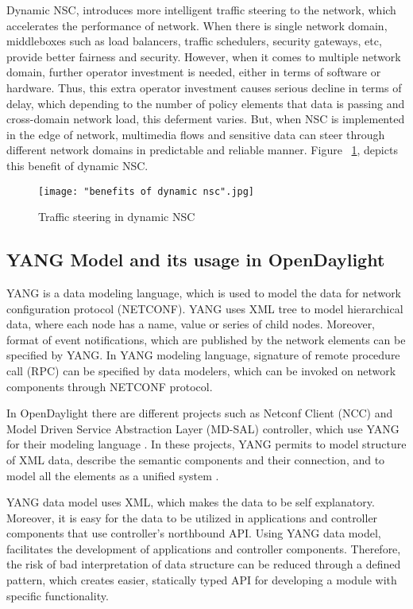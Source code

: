 \documentclass[english]{tktltiki2}
\theoremstyle{definition}
\theoremstyle{remark}
\begin{document}
Dynamic NSC, introduces more intelligent traffic steering to the network, which accelerates the performance of network. When there is single network domain, middleboxes such as load balancers, traffic schedulers, security gateways, etc, provide better fairness and  security. However, when it comes to multiple network domain, further operator investment is needed, either in terms of software or hardware. Thus, this extra operator investment causes serious decline in terms of delay, which depending to the number of policy elements that data is passing and cross-domain network load, this deferment varies. But, when NSC is implemented in the edge of network, multimedia flows and sensitive data can steer through different network domains in predictable and reliable manner. Figure ~\ref{fig:NSCbenefit}, depicts this benefit of dynamic NSC. 


\begin{figure}[h!]
\centering
{}
\texttt{[image: "benefits of dynamic nsc".jpg]}
\caption{Traffic steering in dynamic NSC \cite{Wol13}}
\label{fig:NSCbenefit}
\end{figure}

\subsection{YANG Model and its usage in OpenDaylight}

YANG is a data modeling language, which is used to model the data for network configuration protocol (NETCONF). YANG uses XML tree to model hierarchical data, where each node has a name, value or series of child nodes. Moreover, format of event notifications, which are published by the network elements can be specified by YANG. In YANG modeling language, signature of remote procedure call (RPC) can be specified by data modelers, which can be invoked on network components through NETCONF protocol. \cite{Bjo10}

In OpenDaylight there are different projects such as Netconf Client (NCC) and Model Driven Service Abstraction Layer (MD-SAL) controller, which use YANG for their modeling language \cite{MDS} \cite{Netconf}. In these projects, YANG permits to model structure of XML data, describe the semantic components and their connection, and to model all the elements as a unified system \cite{MDS}.

YANG data model uses XML, which makes the data to be self explanatory. Moreover, it is easy for the data to be utilized in applications and controller components that use controller’s northbound API. Using YANG data model, facilitates the development of applications and controller components. Therefore, the risk of bad interpretation of data structure can be reduced through a defined pattern, which creates easier, statically typed API for developing a module with specific functionality. 
\end{document}

